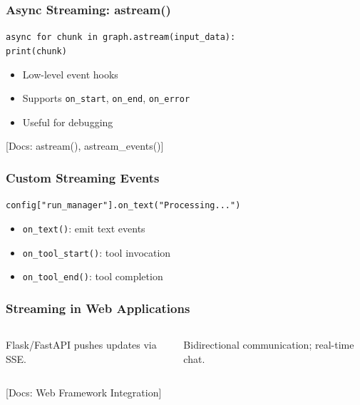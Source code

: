 \documentclass[aspectratio=169,11pt]{beamer}
\newcommand{\docref}[1]{{\scriptsize\color{docgray}[Docs: #1]}}
\begin{document}
\begin{frame}
\frametitle{Async Streaming: astream()}
\begin{tipbox}
\texttt{async for chunk in graph.astream(input\_data):}\\
\quad\texttt{print(chunk)}
\end{tipbox}
\vspace{0.1cm}
\begin{tipbox}
\setlength{\itemsep}{1pt}
\begin{itemize}
\item Low-level event hooks
\item Supports \texttt{on\_start}, \texttt{on\_end}, \texttt{on\_error}
\item Useful for debugging
\end{itemize}
\end{tipbox}
\docref{astream(), astream\_events()}
\end{frame}

\begin{frame}
\frametitle{Custom Streaming Events}
\begin{tipbox}
\texttt{config["run\_manager"].on\_text("Processing...")}
\end{tipbox}
\vspace{0.1cm}
\begin{tipbox}
\setlength{\itemsep}{1pt}
\begin{itemize}
\item \texttt{on\_text()}: emit text events
\item \texttt{on\_tool\_start()}: tool invocation
\item \texttt{on\_tool\_end()}: tool completion
\end{itemize}
\end{tipbox}
\end{frame}

\begin{frame}
\frametitle{Streaming in Web Applications}
\begin{columns}[T]
\begin{tipbox}
Flask/FastAPI pushes updates via SSE.
\end{tipbox}
\begin{tipbox}[WebSocket]
Bidirectional communication; real-time chat.
\end{tipbox}
\end{columns}
\vspace{0.1cm}
\docref{Web Framework Integration}
\end{frame}
\end{document}
